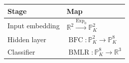 \documentclass[border=8pt]{standalone}
\begin{document}
\renewcommand{\arraystretch}{1.3}
\setlength{\tabcolsep}{12pt}
\begin{tabular}{ll}
\toprule
Stage & Map \\
\midrule
Input embedding & $\mathbb{R}^{2}\xrightarrow{\operatorname{Exp}_{0}}\mathbb{P}^{2}_{K}$ \\
Hidden layer & $\operatorname{BFC}:\mathbb{P}^{2}_{K}\to\mathbb{P}^{8}_{K}$ \\
Classifier & $\operatorname{BMLR}:\mathbb{P}^{8}_{K}\to\mathbb{R}^{3}$ \\
\bottomrule
\end{tabular}
\end{document}
